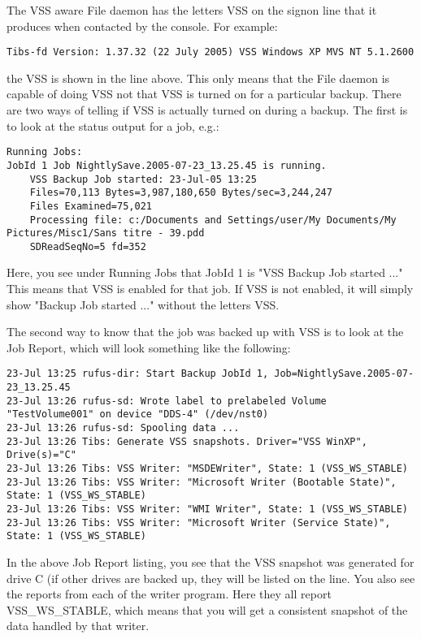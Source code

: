 The VSS aware File daemon has the letters VSS on the signon line that
it produces when contacted by the console. For example:
\begin{verbatim}
Tibs-fd Version: 1.37.32 (22 July 2005) VSS Windows XP MVS NT 5.1.2600
\end{verbatim}
the VSS is shown in the line above. This only means that the File daemon
is capable of doing VSS not that VSS is turned on for a particular backup.
There are two ways of telling if VSS is actually turned on during a backup.
The first is to look at the status output for a job, e.g.:
\footnotesize
\begin{verbatim}
Running Jobs:
JobId 1 Job NightlySave.2005-07-23_13.25.45 is running.
    VSS Backup Job started: 23-Jul-05 13:25
    Files=70,113 Bytes=3,987,180,650 Bytes/sec=3,244,247
    Files Examined=75,021
    Processing file: c:/Documents and Settings/user/My Documents/My Pictures/Misc1/Sans titre - 39.pdd
    SDReadSeqNo=5 fd=352
\end{verbatim}
\normalsize
Here, you see under Running Jobs that JobId 1 is "VSS Backup Job started ..."
This means that VSS is enabled for that job.  If VSS is not enabled, it will
simply show "Backup Job started ..." without the letters VSS.

The second way to know that the job was backed up with VSS is to look at the
Job Report, which will look something like the following:
\footnotesize
\begin{verbatim}
23-Jul 13:25 rufus-dir: Start Backup JobId 1, Job=NightlySave.2005-07-23_13.25.45
23-Jul 13:26 rufus-sd: Wrote label to prelabeled Volume "TestVolume001" on device "DDS-4" (/dev/nst0)
23-Jul 13:26 rufus-sd: Spooling data ...
23-Jul 13:26 Tibs: Generate VSS snapshots. Driver="VSS WinXP", Drive(s)="C"
23-Jul 13:26 Tibs: VSS Writer: "MSDEWriter", State: 1 (VSS_WS_STABLE)
23-Jul 13:26 Tibs: VSS Writer: "Microsoft Writer (Bootable State)", State: 1 (VSS_WS_STABLE)
23-Jul 13:26 Tibs: VSS Writer: "WMI Writer", State: 1 (VSS_WS_STABLE)
23-Jul 13:26 Tibs: VSS Writer: "Microsoft Writer (Service State)", State: 1 (VSS_WS_STABLE)
\end{verbatim}
\normalsize
In the above Job Report listing, you see that the VSS snapshot was generated for drive C (if
other drives are backed up, they will be listed on the  line.
You also see the
reports from each of the writer program.  Here they all report VSS\_WS\_STABLE, which means
that you will get a consistent snapshot of the data handled by that writer.

